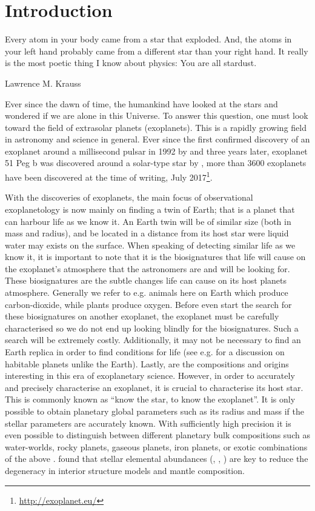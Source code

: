 \chapter{Introduction}
\label{cha:introduction}
\epigraph{Every atom in your body came from a star that exploded. And, the atoms in your left hand
          probably came from a different star than your right hand. It really is the most poetic
          thing I know about physics: You are all stardust.}{Lawrence M. Krauss}

Ever since the dawn of time, the humankind have looked at the stars and wondered if we are alone in
this Universe. To answer this question, one must look toward the field of extrasolar planets
(exoplanets). This is a rapidly growing field in astronomy and science in general. Ever since the
first confirmed discovery of an exoplanet around a millisecond pulsar in 1992 by
\citet{Wolszczan1992} and three years later, exoplanet 51 Peg b was discovered around a solar-type
star by \citet{Mayor1995}, more than 3600 exoplanets have been discovered at the time of writing,
July 2017\footnote{\url{http://exoplanet.eu/}}.

With the discoveries of exoplanets, the main focus of observational exoplanetology is now mainly on
finding a twin of Earth; that is a planet that can harbour life as we know it. An Earth twin will be
of similar size (both in mass and radius), and be located in a distance from its host star were
liquid water may exists on the surface. When speaking of detecting similar life as we know it, it is
important to note that it is the biosignatures that life will cause on the exoplanet's atmosphere
that the astronomers are and will be looking for. These biosignatures are the subtle changes life
can cause on its host planets atmosphere. Generally we refer to e.g. animals here on Earth which
produce carbon-dioxide, while plants produce oxygen. Before even start the search for these
biosignatures on another exoplanet, the exoplanet must be carefully characterised so we do not end
up looking blindly for the biosignatures. Such a search will be extremely costly. Additionally, it
may not be necessary to find an Earth replica in order to find conditions for life (see e.g.
\citet{Alibert2014} for a discussion on habitable planets unlike the Earth). Lastly, are the
compositions and origins interesting in this era of exoplanetary science. However, in order to
accurately and precisely characterise an exoplanet, it is crucial to characterise its host star.
This is commonly known as ``know the star, to know the exoplanet''. It is only possible to obtain
planetary global parameters such as its radius and mass if the stellar parameters are accurately
known. With sufficiently high precision it is even possible to distinguish between different
planetary bulk compositions such as water-worlds, rocky planets, gaseous planets, iron planets, or
exotic combinations of the above \citep[e.g.][]{Thiabaud2014,Dorn2015}. \citet{Dorn2015} found that
stellar elemental abundances (, , ) are key to reduce the degeneracy in
interior structure models and mantle composition.


